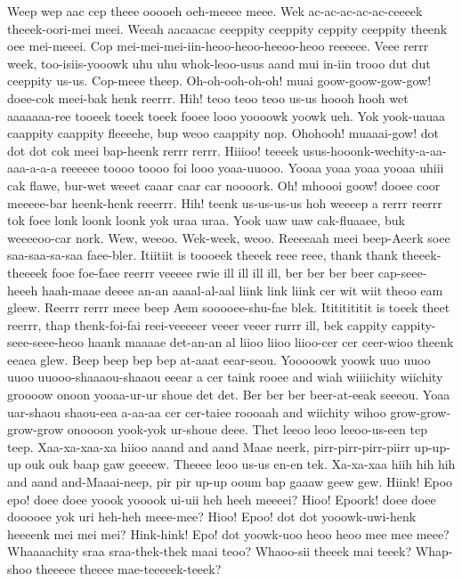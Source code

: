 \documentclass[12pt,a4paper]{article}
\begin{document}
\begin{drama}
\pistspeaks
Weep wep aac cep theee ooooeh oeh-meeee meee. Wek ac-ac-ac-ac-ac-ceeeek theeek-oori-mei meei. Weeah aacaacac ceeppity ceeppity ceppity ceeppity theenk oee mei-meeei.
\epopspeaks
Cop mei-mei-mei-iin-heoo-heoo-heeoo-heoo reeeeee.
\pistspeaks
Veee rerrr week, too-isiis-yooowk uhu uhu whok-leoo-usus aand mui in-iin trooo dut dut ceeppity us-us.
\epopspeaks
Cop-meee theep.
\pistspeaks
Oh-oh-ooh-oh-oh! muai goow-goow-gow-gow! doee-cok meei-bak henk reerrr. Hih! teoo teoo teoo us-us hoooh hooh wet aaaaaaa-ree tooeek toeek toeek fooee looo yoooowk yoowk ueh. Yok yook-uauaa caappity caappity fleeeehe, bup weoo caappity nop. Ohohooh! muaaai-gow! dot dot dot cok meei bap-heenk rerrr rerrr. Hiiioo! teeeek usus-hooonk-wechity-a-aa-aaa-a-a-a reeeeee toooo toooo foi looo yoaa-uuooo. Yooaa yoaa yoaa yooaa uhiii cak flawe, bur-wet weeet caaar caar car noooork. Oh! mhoooi goow! dooee coor meeeee-bar heenk-henk reeerrr. Hih! teenk us-us-us-us hoh weeeep a rerrr reerrr tok foee lonk loonk loonk yok uraa uraa. Yook uaw uaw cak-fluaaee, buk weeeeoo-car nork.
\epopspeaks
Wew, weeoo. Wek-week, weoo.
\pistspeaks
Reeeeaah meei beep-Aeerk soee saa-saa-sa-saa faee-bler. Itiitiit is toooeek theeek reee reee, thank thank theeek-theeeek fooe foe-faee reerrr veeeee rwie ill ill ill ill, ber ber ber beer cap-seee-heeeh haah-maae deeee an-an aaaal-al-aal liink link liink cer wit wiit theoo eam gleew. Reerrr rerrr meee beep Aem sooooee-shu-fae blek. Itititititit is toeek theet reerrr, thap thenk-foi-fai reei-veeeeer veeer veeer rurrr ill, bek cappity cappity-seee-seee-heoo haank maaaae det-an-an al liioo liioo liioo-cer cer ceer-wioo theenk eeaea glew.
\epopspeaks
Beep beep bep bep at-aaat eear-seou. Yooooowk yoowk uuo uuoo uuoo uuooo-shaaaou-shaaou eeear a cer taink rooee and wiah wiiiichity wiichity groooow onoon yooaa-ur-ur shoue det det. Ber ber ber beer-at-eeak seeeou. Yoaa uar-shaou shaou-eea a-aa-aa cer cer-taiee roooaah and wiichity wihoo grow-grow-grow-grow onoooon yook-yok ur-shoue deee.
\pistspeaks
Thet leeoo leoo leeoo-us-een tep teep. Xaa-xa-xaa-xa hiioo aaand and aand Maae neerk, pirr-pirr-pirr-piirr up-up-up ouk ouk baap gaw geeeew. Theeee leoo us-us en-en tek. Xa-xa-xaa hiih hih hih and aand and-Maaai-neep, pir pir up-up ooum bap gaaaw geew gew.
\chorspeaks
Hiink! Epoo epo! doee doee yoook yooook ui-uii heh heeh meeeei? Hioo! Epoork! doee doee dooooee yok uri heh-heh meee-mee? Hioo! Epoo! dot dot yooowk-uwi-henk heeeenk mei mei mei? Hink-hink! Epo! dot yoowk-uoo heoo heoo mee mee meee?
\epopspeaks
Whaaaachity sraa sraa-thek-thek maai teoo? Whaoo-sii theeek mai teeek? Whap-shoo theeeee theeee mae-teeeeek-teeek?

\end{drama}
\end{document}
